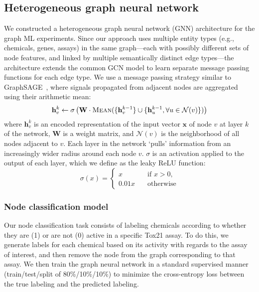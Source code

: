 \documentclass{ws-procs11x85}
\begin{document}
\subsection{Heterogeneous graph neural network}
We constructed a heterogeneous graph neural network (GNN) architecture for the graph ML experiments.
Since our approach uses multiple entity types (e.g., chemicals, genes, assays) in the same graph---each with possibly different sets of node features, and linked by multiple semantically distinct edge types---the architecture extends the common GCN model to learn separate message passing functions for each edge type.
We use a message passing strategy similar to GraphSAGE~\cite{hamilton2017inductive}, where signals propagated from adjacent nodes are aggregated using their arithmetic mean:
\begin{equation}
\mathbf{h}_v^k \gets \sigma\left(\mathbf{W} \cdot \textsc{Mean}(\{\mathbf{h}_v^{k-1}\}\cup \{ \mathbf{h}_u^{k-1},\forall u \in \mathcal{N}(v) \})\right)
\end{equation}
where $\mathbf{h}_v^{k}$ is an encoded representation of the input vector $\mathbf{x}$ of node $v$ at layer $k$ of the network, $\mathbf{W}$ is a weight matrix, and $\mathcal{N}(v)$ is the neighborhood of all nodes adjacent to $v$.
Each layer in the network `pulls' information from an increasingly wider radius around each node $v$.
$\sigma$ is an activation applied to the output of each layer, which we define as the leaky ReLU function:
\begin{equation}
\sigma(x) =
\begin{cases}
   x & \quad \text{if } x > 0,\\
   0.01x & \quad \text{otherwise}
\end{cases}
\end{equation}

\subsubsection{Node classification model}
Our node classification task consists of labeling chemicals according to whether they are (1) or are not (0) active in a specific Tox21 assay.
To do this, we generate labels for each chemical based on its activity with regards to the assay of interest, and then remove the node from the graph corresponding to that assay.
We then train the graph neural network in a standard supervised manner (train/test/split of 80\%/10\%/10\%) to minimize the cross-entropy loss between the true labeling and the predicted labeling.
\end{document}
